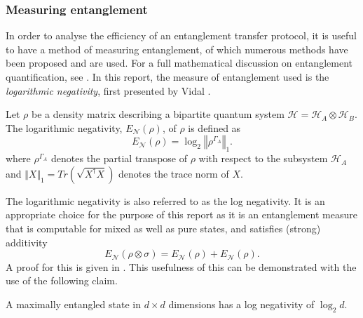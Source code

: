 \subsubsection{Measuring entanglement}
\label{subsubsection:measure_entanglement}
In order to analyse the efficiency of an entanglement transfer protocol, it is useful to have a method of measuring entanglement, of which numerous methods have been proposed and are used.
For a full mathematical discussion on entanglement quantification, see \cite{Plenio_2007}.
In this report, the measure of entanglement used is the \emph{logarithmic negativity}, first presented by Vidal \cite{Vidal_2002}.
\begin{definition}
    \label{definition:log_neg}
    Let $\rho$ be a density matrix describing a bipartite quantum system $\mathcal{H} = \mathcal{H}_A \otimes \mathcal{H}_B$.
    The logarithmic negativity, $E_\mathcal{N}(\rho)$, of $\rho$ is defined as
    \begin{equation}
        E_\mathcal{N}(\rho) = \log_2\left\Vert \rho^{\Gamma_A}\right\Vert_1.
    \end{equation}
    where $\rho^{\Gamma_A}$ denotes the partial transpose of $\rho$ with respect to the subsystem $\mathcal{H}_A$ and $\Vert X\Vert_1 = Tr(\sqrt{X^\dagger X})$ denotes the trace norm of $X$.
\end{definition}
The logarithmic negativity is also referred to as the log negativity.
It is an appropriate choice for the purpose of this report as it is an entanglement measure that is computable for mixed as well as pure states, and satisfies (strong) additivity
\begin{equation}
    E_\mathcal{N}(\rho \otimes \sigma) = E_\mathcal{N}(\rho) + E_\mathcal{N}(\rho).
\end{equation}
A proof for this is given in \cite{Vidal_2002}.\newline
This usefulness of this can be demonstrated with the use of the following claim.
\begin{claim}
    \label{claim:maximally_entangled_states}
    A maximally entangled state in $d\times d$ dimensions has a log negativity of $\log_2d$.
\end{claim}
